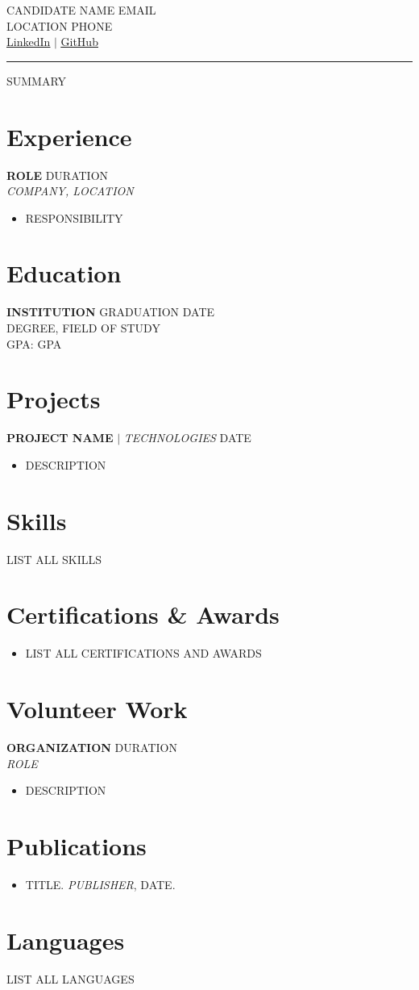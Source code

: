 \documentclass[letterpaper,10pt]{article}
\newcommand{\resumeItem}[1]{\item\small{#1\vspace{-2pt}}}
\newcommand{\resumeItemListStart}{\begin{itemize}[leftmargin=*,topsep=0pt,itemsep=0pt]}
\newcommand{\resumeItemListEnd}{\end{itemize}\vspace{-4pt}}
\begin{document}
{\LARGE CANDIDATE NAME} \hfill \small EMAIL \\
\small LOCATION \hfill PHONE \\
\small \href{LINKEDIN}{\underline{LinkedIn}} $|$ \href{GITHUB}{\underline{GitHub}}

\vspace{8pt}
\color{lightgray}\rule{\linewidth}{0.3pt}
\color{black}
\vspace{4pt}

SUMMARY

\vspace{6pt}

\section{Experience}
\textbf{ROLE} \hfill DURATION \\
\small\textit{COMPANY, LOCATION}
\resumeItemListStart
  \resumeItem{RESPONSIBILITY}
\resumeItemListEnd

\section{Education}
\textbf{INSTITUTION} \hfill GRADUATION DATE \\
\small DEGREE, FIELD OF STUDY \\
\small GPA: GPA

\section{Projects}
\textbf{PROJECT NAME} $|$ \small\textit{TECHNOLOGIES} \hfill DATE
\resumeItemListStart
  \resumeItem{DESCRIPTION}
\resumeItemListEnd

\section{Skills}
\small LIST ALL SKILLS

\section{Certifications \& Awards}
\resumeItemListStart
  \resumeItem{LIST ALL CERTIFICATIONS AND AWARDS}
\resumeItemListEnd

\section{Volunteer Work}
\textbf{ORGANIZATION} \hfill DURATION \\
\small\textit{ROLE}
\resumeItemListStart
  \resumeItem{DESCRIPTION}
\resumeItemListEnd

\section{Publications}
\resumeItemListStart
  \resumeItem{TITLE. \textit{PUBLISHER}, DATE.}
\resumeItemListEnd

\section{Languages}
\small LIST ALL LANGUAGES
\end{document}
